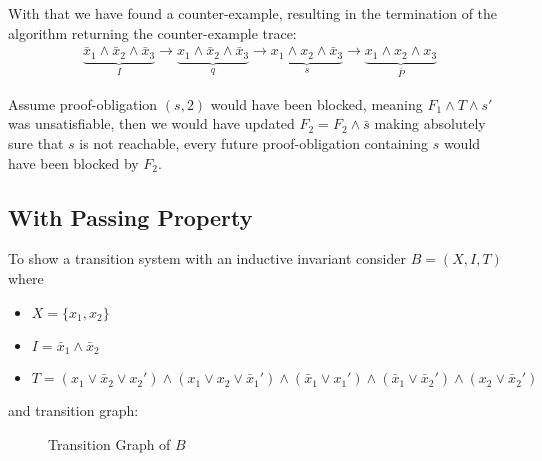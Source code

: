 \documentclass[11pt, a4paper, BCOR=10mm, ngerman, oneside]{scrbook}
\begin{document}
With that we have found a counter-example, resulting in the termination of the algorithm returning the counter-example trace: 
\begin{align*}
\underbrace{\bar x_1 \land \bar x_2 \land \bar x_3}_{I} \rightarrow \underbrace{x_1 \land \bar x_2 \land \bar x_3}_{q} \rightarrow \underbrace{x_1 \land x_2 \land \bar x_3}_{s} \rightarrow \underbrace{x_1 \land x_2 \land x_3}_{\bar P}   
\end{align*}

Assume proof-obligation $(s, 2)$ would have been blocked, meaning $F_1 \land T \land s'$ was unsatisfiable, then we would have updated $F_2 = F_2 \land \bar s$ making absolutely sure that $s$ is not reachable, every future proof-obligation containing $s$ would have been blocked by $F_2$.

\pagebreak

\subsection{With Passing Property}
To show a transition system with an inductive invariant consider $B = (X, I, T)$ where
\begin{itemize}
\item $X = \{x_1, x_2\}$
\item $I = \bar x_1 \land \bar x_2 $
\item  $T = ( x_1 \lor \bar x_2 \lor x_2') \land (x_1 \lor x_2 \lor \bar x_1') \land (\bar x_1 \lor x_1') \land (\bar x_1 \lor \bar x_2') \land (x_2 \lor \bar x_2')$
\end{itemize}
and transition graph: \\


\begin{figure}[H]
\centering
{}
  \caption{Transition Graph of $B$}
 \end{figure}
 \label{ex1}  
\end{document}

